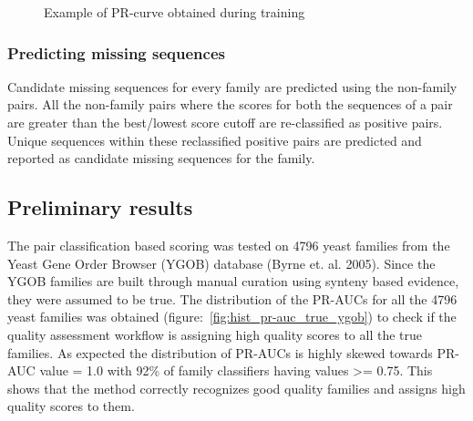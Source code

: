 \documentclass{article}
\begin{document}
			\begin{figure}[h!]
				\caption{Example of PR-curve obtained during training}
				\label{fig:test_PR-curve}
			\end{figure}
		
			\subsubsection{Predicting missing sequences}
			Candidate missing sequences for every family are predicted using the non-family pairs. All the non-family pairs where the scores for both the sequences of a pair are greater than the best/lowest score cutoff are re-classified as positive pairs. Unique sequences within these reclassified positive pairs are predicted and reported as candidate missing sequences for the family.
			
		\subsection{Preliminary results}
		The pair classification based scoring was tested on 4796 yeast families from the Yeast Gene Order Browser (YGOB) database (Byrne et. al. 2005). Since the YGOB families are built through manual curation using synteny based evidence, they were assumed to be true. The distribution of the PR-AUCs for all the 4796 yeast families was obtained (figure:~\ref{fig:hist_pr-auc_true_ygob}) to check if the quality assessment workflow is assigning high quality scores to all the true families. As expected the distribution of PR-AUCs is highly skewed towards PR-AUC value = 1.0 with 92\% of family classifiers having values >= 0.75. This shows that the method correctly recognizes good quality families and assigns high quality scores to them.
		
\end{document}
